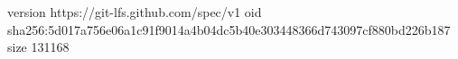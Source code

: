 version https://git-lfs.github.com/spec/v1
oid sha256:5d017a756e06a1c91f9014a4b04dc5b40e303448366d743097cf880bd226b187
size 131168
